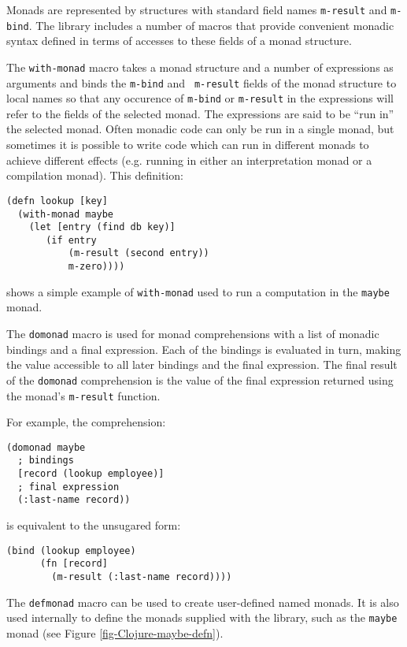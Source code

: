 \documentclass[natbib,10pt]{sigplanconf}
\begin{document}
Monads are represented by structures with standard field names
{\tt m-result} and {\tt m-bind}. The library includes a number of
macros that provide convenient monadic syntax defined in terms
of accesses to these fields of a monad structure.

The {\tt with-monad} macro takes a monad structure and a number of
expressions as arguments and binds the {\tt m-bind} and {\tt
  m-result} fields of the monad structure to local names so that any
occurence of {\tt m-bind} or {\tt m-result} in the expressions
will refer to the fields of the selected monad.  The expressions are
said to be ``run in'' the selected monad.  Often monadic code can only
be run in a single monad, but sometimes it is possible to write code
which can run in different monads to achieve different effects
(e.g. running in either an interpretation monad or a compilation
monad).  This definition:
\begin{verbatim}
(defn lookup [key]
  (with-monad maybe
    (let [entry (find db key)]
       (if entry
           (m-result (second entry))
           m-zero))))
\end{verbatim}
shows a simple example of {\tt with-monad} used to run a computation
in the {\tt maybe} monad.

The {\tt domonad} macro is used for monad comprehensions with a list
of monadic bindings and a final expression.  Each of the bindings is
evaluated in turn, making the value accessible to all later bindings
and the final expression.  The final result of the {\tt domonad}
comprehension is the value of the final expression returned using
the monad's {\tt m-result} function.

\pagebreak

For example, the comprehension:
\begin{verbatim}
(domonad maybe
  ; bindings
  [record (lookup employee)]
  ; final expression
  (:last-name record))
\end{verbatim}
is equivalent to the unsugared form:
\begin{verbatim}
(bind (lookup employee)
      (fn [record]
        (m-result (:last-name record))))
\end{verbatim}

The {\tt defmonad} macro can be used to create user-defined named
monads.  It is also used internally to define the monads supplied
with the library, such as the {\tt maybe} monad
(see Figure \ref{fig-Clojure-maybe-defn}).
\end{document}

